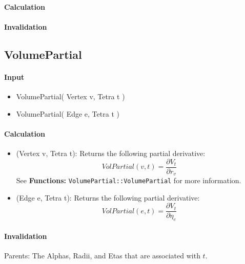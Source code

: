 \paragraph{Calculation}

\paragraph{Invalidation}

\bigskip

\subsection{VolumePartial}

\paragraph{Input}

\begin{itemize}
\item VolumePartial( Vertex v, Tetra t )

\item VolumePartial( Edge e, Tetra t )
\end{itemize}

\paragraph{Calculation}

\begin{itemize}
\item (Vertex v, Tetra t): Returns the following partial derivative: 
\begin{equation*}
VolPartial(v,t)=\frac{\partial V_{t}}{\partial r_{v}}
\end{equation*}%
See \textbf{Functions: }\texttt{VolumePartial::VolumePartial} for more
information.

\item (Edge e, Tetra t): Returns the following partial derivative: 
\begin{equation*}
VolPartial(e,t)=\frac{\partial V_{t}}{\partial \eta _{e}}
\end{equation*}
\end{itemize}

\paragraph{Invalidation}

Parents: The Alphas, Radii, and Etas that are associated with $t$.

